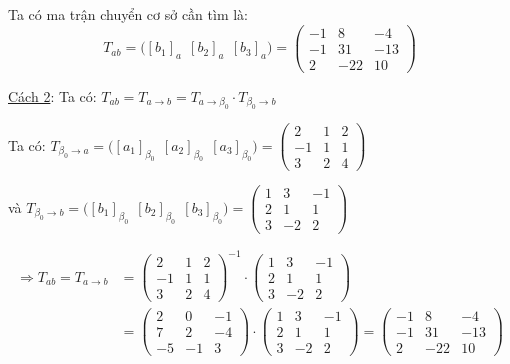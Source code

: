 \documentclass[12pt,a4paper]{article}
\begin{document}
Ta có ma trận chuyển cơ sở cần tìm là:
\[
T_{ab}=\big([b_1]_a \ \ [b_2]_a \ \ [b_3]_a\big)=
\begin{pmatrix}
-1 & 8 & -4\\
-1 & 31 & -13\\
2 & -22 & 10
\end{pmatrix}
\]

\noindent\underline{Cách 2}: Ta có: $T_{ab}=T_{a\to b}=T_{a\to\beta_0}\cdot T_{\beta_0\to b}$

Ta có: $T_{\beta_0\to a}=\big([a_1]_{\beta_0}\ \ [a_2]_{\beta_0}\ \ [a_3]_{\beta_0}\big)=
\begin{pmatrix}
2 & 1 & 2\\
-1 & 1 & 1\\
3 & 2 & 4
\end{pmatrix}$

và $T_{\beta_0\to b}=\big([b_1]_{\beta_0}\ \ [b_2]_{\beta_0}\ \ [b_3]_{\beta_0}\big)=
\begin{pmatrix}
1 & 3 & -1\\
2 & 1 & 1\\
3 & -2 & 2
\end{pmatrix}$

\begin{align*}
\Rightarrow T_{ab}=T_{a\to b} &=
\begin{pmatrix}
2 & 1 & 2\\
-1 & 1 & 1\\
3 & 2 & 4
\end{pmatrix}^{-1}
\cdot
\begin{pmatrix}
1 & 3 & -1\\
2 & 1 & 1\\
3 & -2 & 2
\end{pmatrix}
\\
&=
\begin{pmatrix}
2 & 0 & -1\\
7 & 2 & -4\\
-5 & -1 & 3
\end{pmatrix}
\cdot
\begin{pmatrix}
1 & 3 & -1\\
2 & 1 & 1\\
3 & -2 & 2
\end{pmatrix}
=
\begin{pmatrix}
-1 & 8 & -4\\
-1 & 31 & -13\\
2 & -22 & 10
\end{pmatrix}
\end{align*}
\end{document}
